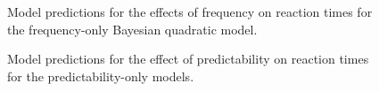 \documentclass[
  authoryear,
  preprint,
  1p,
  onecolumn]{elsarticle}
\begin{document}
\begin{figure}


\caption{\label{fig-FreqOnlyPlot}Model predictions for the effects of
frequency on reaction times for the frequency-only Bayesian quadratic
model.}

\end{figure}%

\begin{figure}


\caption{\label{fig-PredicOnlyPlot}Model predictions for the effect of
predictability on reaction times for the predictability-only models.}

\end{figure}%
\end{document}
